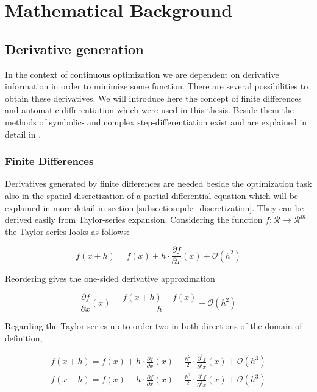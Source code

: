 \documentclass{scrartcl}[12pt, halfparskip]
\begin{document}
\newpage
\section{Mathematical Background}

\subsection{Derivative generation}
In the context of continuous optimization we are dependent on derivative information in order to minimize some function. 
There are several possibilities to obtain these derivatives. We will introduce here the concept of finite differences and automatic differentiation which were used in this thesis. 
Beside them the methods of symbolic- and complex step-differentiation exist and are explained in detail in \cite{diss_jan}.

\subsubsection{Finite Differences}
\label{subsubsec:finite_differences}
Derivatives generated by finite differences are needed beside the optimization task also in the spatial discretization of a partial differential equation which will be explained in more detail in section \ref{subsection:pde_discretization}.
They can be derived easily from Taylor-series expansion. Considering the function $f: \mathcal{R} \rightarrow \mathcal{R}^m$ the Taylor series looks as follows:


\begin{equation}
f(x+h) = f(x) + h \cdot \frac{\partial f}{\partial x}(x) + \mathcal{O}(h^2)
\end{equation}

Reordering gives the one-sided derivative approximation

\begin{equation}
\frac{\partial f}{\partial x}(x) = \frac{f(x+h) - f(x)}{h} + \mathcal{O}(h^2)
\end{equation}

Regarding the Taylor series up to order two in both directions of the domain of definition,

\begin{subequations}
	\label{eq:finite_differences_taylor_exp}
	\begin{align}
	f(x+h) = f(x) + h \cdot \frac{\partial f}{\partial x}(x) + \frac{h^2}{2} \cdot \frac{\partial^2 f}{\partial^2 x}(x) + \mathcal{O}(h^3) \label{eq:finite_differences_taylor_exp_+} \\
	f(x-h) = f(x) - h \cdot \frac{\partial f}{\partial x}(x) + \frac{h^2}{2} \cdot \frac{\partial^2 f}{\partial^2 x}(x) + \mathcal{O}(h^3)  \label{eq:finite_differences_taylor_exp_-}	
	\end{align}
\end{subequations}
\end{document}
